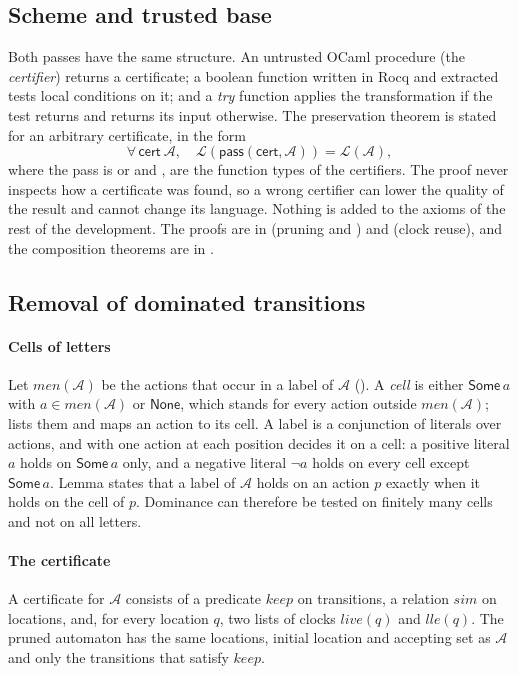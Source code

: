 \subsection{Scheme and trusted base}
Both passes have the same structure. An untrusted OCaml procedure (the \emph{certifier}) returns a certificate; a boolean function written in Rocq and extracted tests local conditions on it; and a \emph{try} function applies the transformation if the test returns  and returns its input otherwise. The preservation theorem is stated for an arbitrary certificate, in the form
\[
\forall\, \mathsf{cert}\ \mathcal A,\quad \mathcal L(\mathsf{pass}(\mathsf{cert},\mathcal A))=\mathcal L(\mathcal A),
\]
where the pass is  or  and ,  are the function types of the certifiers. The proof never inspects how a certificate was found, so a wrong certifier can lower the quality of the result and cannot change its language. Nothing is added to the axioms of the rest of the development. The proofs are in  (pruning and ) and  (clock reuse), and the composition theorems are in .

\subsection{Removal of dominated transitions}\label{sec:prune-detail}
\paragraph{Cells of letters} Let $\mathit{men}(\mathcal A)$ be the actions that occur in a label of $\mathcal A$ (). A \emph{cell} is either $\mathsf{Some}\,a$ with $a\in\mathit{men}(\mathcal A)$ or $\mathsf{None}$, which stands for every action outside $\mathit{men}(\mathcal A)$;  lists them and  maps an action to its cell. A label is a conjunction of literals over actions, and with one action at each position  decides it on a cell: a positive literal $a$ holds on $\mathsf{Some}\,a$ only, and a negative literal $\neg a$ holds on every cell except $\mathsf{Some}\,a$. Lemma  states that a label of $\mathcal A$ holds on an action $p$ exactly when it holds on the cell of $p$. Dominance can therefore be tested on finitely many cells and not on all letters.

\paragraph{The certificate} A certificate for $\mathcal A$ consists of a predicate $\mathit{keep}$ on transitions, a relation $\mathit{sim}$ on locations, and, for every location $q$, two lists of clocks $\mathit{live}(q)$ and $\mathit{lle}(q)$. The pruned automaton  has the same locations, initial location and accepting set as $\mathcal A$ and only the transitions that satisfy $\mathit{keep}$.

